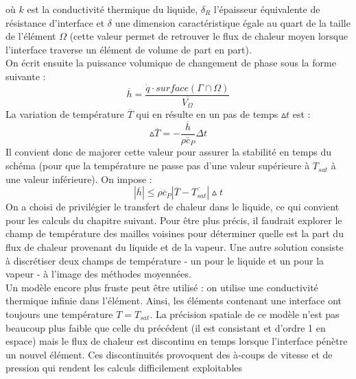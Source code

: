 o\`u $k$ est la conductivit\'e thermique du liquide, $\delta_{R}$ l'\'epaisseur \'equivalente de r\'esistance d'interface et $\delta$ une dimension caract\'eristique \'egale au quart de la taille de l'\'el\'ement $\Omega$ (cette valeur permet de retrouver le flux de chaleur moyen lorsque l'interface traverse un \'el\'ement de volume de part en part).\\
On \'ecrit ensuite la puissance volumique de changement de phase sous la forme
suivante :
\begin{equation}
\overline{h} \hat{=} \dfrac{\dot{q} \cdot surface(\Gamma \cap \Omega)}{\overline{V_{\Omega}}}
\end{equation}
La variation de temp\'erature $\overline{T}$ qui en r\'esulte en un pas de temps $\vartriangle t$ est :
\begin{equation}
\vartriangle \overline{T} = - \dfrac{\overline{h}}{\overline{\rho c_{P}}} \Delta t
\end{equation}
Il convient donc de majorer cette valeur pour assurer la stabilit\'e en temps du sch\'ema (pour que la temp\'erature ne passe pas d'une valeur sup\'erieure \`a $T_{sat}$ \`a une valeur inf\'erieure). On impose :
\begin{equation}
|\overline{h}| \leq \overline{\rho c_{P}} | \overline{T} - \overline{T_{sat}}| \vartriangle t
\end{equation}
On a choisi de privil\'egier le transfert de chaleur dans le liquide, ce qui convient pour les calculs du chapitre suivant. Pour \^etre plus pr\'ecis, il faudrait explorer le champ de temp\'erature des mailles voisines pour d\'eterminer quelle est la part du flux de chaleur provenant du liquide et de la vapeur. Une autre solution consiste \`a discr\'etiser deux champs de temp\'erature - un pour le liquide et un pour la vapeur - \`a l'image des m\'ethodes moyenn\'ees.\\
Un mod\`ele encore plus fruste peut \^etre utilis\'e : on utilise une conductivit\'e thermique infinie dans l'\'el\'ement. Ainsi, les \'el\'ements contenant une interface ont toujours une temp\'erature $T = T_{sat}$. La pr\'ecision spatiale de ce mod\`ele n'est pas beaucoup plus faible que celle du pr\'ec\'edent (il est consistant et d'ordre 1 en espace) mais le flux de chaleur est discontinu en temps lorsque l'interface p\'enètre un nouvel \'el\'ement. Ces discontinuit\'es provoquent des \`a-coups de vitesse et de pression qui rendent les calculs difficilement exploitables\smallskip \\

